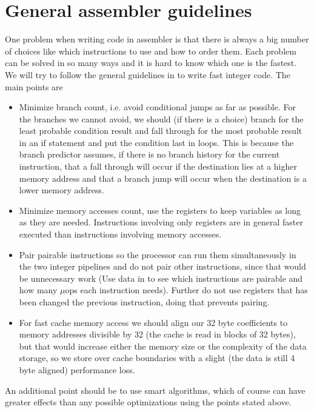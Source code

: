 \section{General assembler guidelines}
One problem when writing code in assembler is that there is always a big number of choices like which instructions to use and how to order them.
Each problem can be solved in so many ways and it is hard to know which one is the fastest.
We will try to follow the general guidelines in \cite{intelopt} to write fast integer code. The main points are
\begin{itemize}
\item Minimize branch count, i.e. avoid conditional jumps as far as possible. For the branches we cannot avoid, we should (if there is a choice) branch for the least probable condition result and fall through for the most probable result in an if statement and put the condition last in loops. This is because the branch predictor assumes, if there is no branch history for the current instruction, that a fall through will occur if the destination lies at a higher memory address and that a branch jump will occur when the destination is a lower memory address. 
\item Minimize memory accesses count, use the registers to keep variables as long as they are needed. Instructions involving only registers are in general faster executed than instructions involving memory accesses.
\item Pair pairable instructions so the processor can run them simultaneously in the two integer pipelines and do not pair other instructions, since that would be unnecessary work (Use data in \cite{intelopt} to see which instructions are pairable and how many $\mu$ops each instruction needs). Further do not use registers that has been changed the previous instruction, doing that prevents pairing. 
\item For fast cache memory access we should align our 32 byte coefficients to memory addresses divisible by 32 (the cache is read in blocks of 32 bytes), but that would increase either the memory size or the complexity of the data storage, so we store over cache boundaries with a slight (the data is still 4 byte aligned) performance loss.
\end{itemize}
An additional point should be to use smart algorithms, which of course can have greater effects than any possible optimizations using the points stated above.

